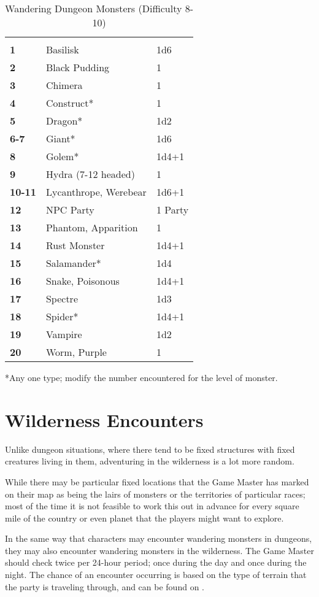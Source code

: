 \begin{multicols*}{2}
\begin {table}[H]
  \caption{Wandering Dungeon Monsters (Difficulty 8-10)}\label{tab:Wandering Dungeon Monsters (Difficulty 8-10)}
  \begin{tabularx}{\columnwidth}{>{\bfseries}YYY}
   &  & \\
	1 & Basilisk & 1d6\\
	2 & Black Pudding & 1\\
	3 & Chimera & 1\\
	4 & Construct* & 1\\
	5 & Dragon* & 1d2\\
	6-7 & Giant* & 1d6\\
	8 & Golem* & 1d4+1\\
	9 & Hydra (7-12 headed) & 1\\
	10-11 & Lycanthrope, Werebear & 1d6+1\\
	12 & NPC Party & 1 Party\\
	13 & Phantom, Apparition & 1\\
	14 & Rust Monster & 1d4+1\\
	15 & Salamander* & 1d4\\
	16 & Snake, Poisonous & 1d4+1\\
	17 & Spectre & 1d3\\
	18 & Spider* & 1d4+1\\
	19 & Vampire & 1d2\\
	20 & Worm, Purple & 1\\
	\end {tabularx}
	*Any one type; modify the number encountered for the level of monster.
\end {table}

\section{Wilderness Encounters}\label{sec:Wilderness Encounters}
Unlike dungeon situations, where there tend to be fixed structures with fixed creatures living in them, adventuring in the wilderness is a lot more random.

While there may be particular fixed locations that the Game Master has marked on their map as being the lairs of monsters or the territories of particular races; most of the time it is not feasible to work this out in advance for every square mile of the country or even planet that the players might want to explore.

In the same way that characters may encounter wandering monsters in dungeons, they may also encounter wandering monsters in the wilderness. The Game Master should check twice per 24-hour period; once during the day and once during the night. The chance of an encounter occurring is based on the type of terrain that the party is traveling through, and can be found on .


\end{multicols*}
